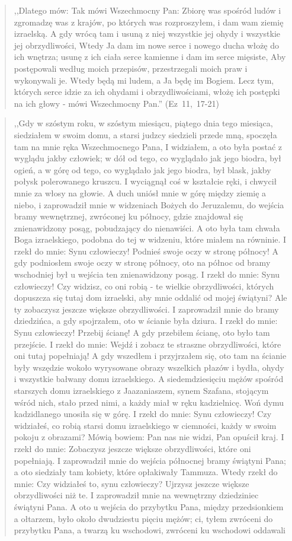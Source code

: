 \documentclass[10pt,a4paper,oneside]{article}
\begin{document}
\begin{quote}
,,Dlatego mów: Tak mówi Wszechmocny Pan: Zbiorę was spośród ludów i zgromadzę was z krajów, po których was rozproszyłem, i dam wam ziemię izraelską. A gdy wrócą tam i usuną z niej wszystkie jej ohydy i wszystkie jej obrzydliwości, Wtedy Ja dam im nowe serce i nowego ducha włożę do ich wnętrza; usunę z ich ciała serce kamienne i dam im serce mięsiste, Aby postępowali według moich przepisów, przestrzegali moich praw i wykonywali je. Wtedy będą mi ludem, a Ja będę im Bogiem. Lecz tym, których serce idzie za ich ohydami i obrzydliwościami, włożę ich postępki na ich głowy - mówi Wszechmocny Pan.'' (Ez~11,~17-21)
\end{quote}
\begin{quote}
,,Gdy w szóstym roku, w szóstym miesiącu, piątego dnia tego miesiąca, siedziałem w swoim domu, a starsi judzcy siedzieli przede mną, spoczęła tam na mnie ręka Wszechmocnego Pana, I widziałem, a oto była postać z wyglądu jakby człowiek; w dół od tego, co wyglądało jak jego biodra, był ogień, a w górę od tego, co wyglądało jak jego biodra, był blask, jakby połysk polerowanego kruszcu. I wyciągnął coś w kształcie ręki, i chwycił mnie za włosy na głowie. A duch uniósł mnie w górę między ziemię a niebo, i zaprowadził mnie w widzeniach Bożych do Jeruzalemu, do wejścia bramy wewnętrznej, zwróconej ku północy, gdzie znajdował się znienawidzony posąg, pobudzający do nienawiści. A oto była tam chwała Boga izraelskiego, podobna do tej w widzeniu, które miałem na równinie. I rzekł do mnie: Synu człowieczy! Podnieś swoje oczy w stronę północy! A gdy podniosłem swoje oczy w stronę północy, oto na północ od bramy wschodniej był u wejścia ten znienawidzony posąg. I rzekł do mnie: Synu człowieczy! Czy widzisz, co oni robią - te wielkie obrzydliwości, których dopuszcza się tutaj dom izraelski, aby mnie oddalić od mojej świątyni? Ale ty zobaczysz jeszcze większe obrzydliwości. I zaprowadził mnie do bramy dziedzińca, a gdy spojrzałem, oto w ścianie była dziura. I rzekł do mnie: Synu człowieczy! Przebij ścianę! A gdy przebiłem ścianę, oto było tam przejście. I rzekł do mnie: Wejdź i zobacz te straszne obrzydliwości, które oni tutaj popełniają! A gdy wszedłem i przyjrzałem się, oto tam na ścianie były wszędzie wokoło wyrysowane obrazy wszelkich płazów i bydła, ohydy i wszystkie bałwany domu izraelskiego. A siedemdziesięciu mężów spośród starszych domu izraelskiego z Jaazaniaszem, synem Szafana, stojącym wśród nich, stało przed nimi, a każdy miał w ręku kadzielnicę. Woń dymu kadzidlanego unosiła się w górę. I rzekł do mnie: Synu człowieczy! Czy widziałeś, co robią starsi domu izraelskiego w ciemności, każdy w swoim pokoju z obrazami? Mówią bowiem: Pan nas nie widzi, Pan opuścił kraj. I rzekł do mnie: Zobaczysz jeszcze większe obrzydliwości, które oni popełniają. I zaprowadził mnie do wejścia północnej bramy świątyni Pana; a oto siedziały tam kobiety, które opłakiwały Tammuza. Wtedy rzekł do mnie: Czy widziałeś to, synu człowieczy? Ujrzysz jeszcze większe obrzydliwości niż te. I zaprowadził mnie na wewnętrzny dziedziniec świątyni Pana. A oto u wejścia do przybytku Pana, między przedsionkiem a ołtarzem, było około dwudziestu pięciu mężów; ci, tyłem zwróceni do przybytku Pana, a twarzą ku wschodowi, zwróceni ku wschodowi oddawali 
\end{quote}
\end{document}
